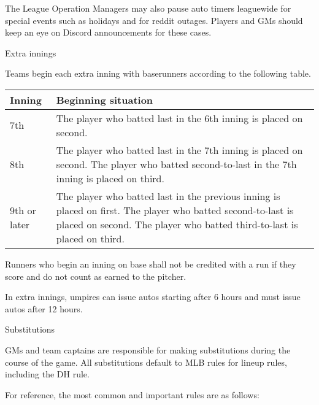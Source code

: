 \begin{deepEnumerate}
\begin{deepEnumerate}
\begin{deepEnumerate}
			\item The League Operation Managers may also pause auto timers leaguewide for special events such as holidays and for reddit outages.
			Players and GMs should keep an eye on Discord announcements for these cases.
		\end{deepEnumerate}
	\end{deepEnumerate}
	\item Extra innings
	\label{sec:extra innings}
	\begin{deepEnumerate}
		\item Teams begin each extra inning with baserunners according to the following table.
		\begin{center}										                
			\begin{longtable}{|p{3cm}|p{8cm}|}
				\hline
				\textbf{Inning} & \textbf{Beginning situation}                                          \\
				\hline
				7th             & The player who batted last in the 6th inning is placed on second.     \\
				\hline
				8th             & The player who batted last in the 7th inning is placed on second.     
				The player who batted second-to-last in the 7th inning is placed on third. \\
				\hline
				9th or later    & The player who batted last in the previous inning is placed on first. 
				The player who batted second-to-last is placed on second.
				The player who batted third-to-last is placed on third. \\
				\hline
			\end{longtable}
		\end{center}
		\item Runners who begin an inning on base shall not be credited with a run if they score and
		do not count as earned to the pitcher.
		\item In extra innings, umpires can issue autos starting after 6 hours and must issue autos after 12 hours.
	\end{deepEnumerate}
	\item Substitutions
	\label{sec:substitutions}
	\begin{deepEnumerate}
		\item GMs and team captains are responsible for making substitutions during the course of the game.
		All substitutions default to MLB rules for lineup rules, including the DH rule.
		\begin{deepEnumerate}
			\item For reference, the most common and important rules are as follows:

\end{deepEnumerate}
\end{deepEnumerate}
\end{deepEnumerate}

